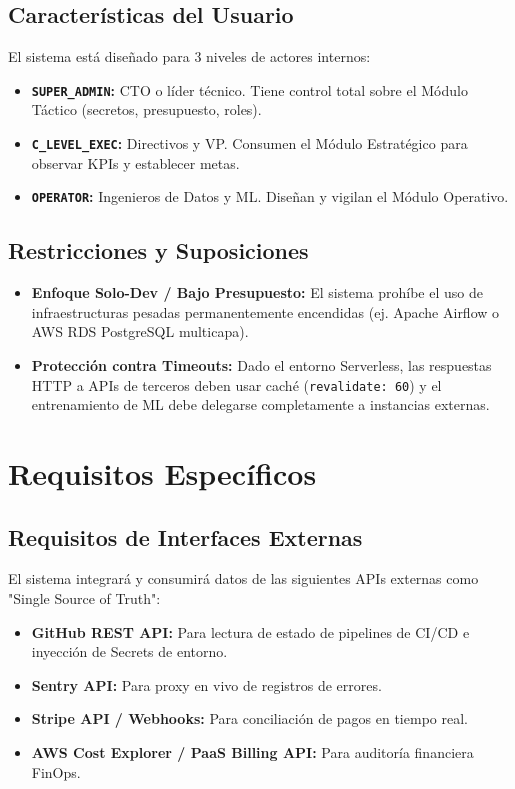 \documentclass[11pt, letterpaper]{article}
\begin{document}
\subsection{Características del Usuario}
El sistema está diseñado para 3 niveles de actores internos:
\begin{itemize}
    \item \textbf{\texttt{SUPER\_ADMIN}:} CTO o líder técnico. Tiene control total sobre el Módulo Táctico (secretos, presupuesto, roles).
    \item \textbf{\texttt{C\_LEVEL\_EXEC}:} Directivos y VP. Consumen el Módulo Estratégico para observar KPIs y establecer metas.
    \item \textbf{\texttt{OPERATOR}:} Ingenieros de Datos y ML. Diseñan y vigilan el Módulo Operativo.
\end{itemize}

\subsection{Restricciones y Suposiciones}
\begin{itemize}
    \item \textbf{Enfoque Solo-Dev / Bajo Presupuesto:} El sistema prohíbe el uso de infraestructuras pesadas permanentemente encendidas (ej. Apache Airflow o AWS RDS PostgreSQL multicapa).
    \item \textbf{Protección contra Timeouts:} Dado el entorno Serverless, las respuestas HTTP a APIs de terceros deben usar caché (\texttt{revalidate: 60}) y el entrenamiento de ML debe delegarse completamente a instancias externas.
\end{itemize}


\section{Requisitos Específicos}

\subsection{Requisitos de Interfaces Externas}
El sistema integrará y consumirá datos de las siguientes APIs externas como "Single Source of Truth":
\begin{itemize}
    \item \textbf{GitHub REST API:} Para lectura de estado de pipelines de CI/CD e inyección de Secrets de entorno.
    \item \textbf{Sentry API:} Para proxy en vivo de registros de errores.
    \item \textbf{Stripe API / Webhooks:} Para conciliación de pagos en tiempo real.
    \item \textbf{AWS Cost Explorer / PaaS Billing API:} Para auditoría financiera FinOps.
\end{itemize}
\end{document}
